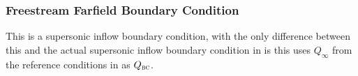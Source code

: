 \subsubsection{Freestream Farfield Boundary Condition}%
\label{SEC:BC:Farfield:Freestream}

This is a supersonic inflow boundary condition, with the only difference between
this and the actual supersonic inflow boundary condition in
 is this uses $Q_{\infty}$ from
the reference conditions in  as $Q_{\textsc{bc}}$.




